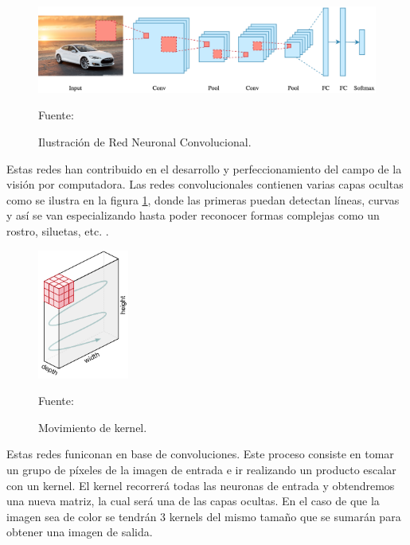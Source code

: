 \begin{figure}[H]
    \begin{center}
        \includegraphics[width=12cm]{img/capitulo_2/convolucional.png}
    \end{center}
    \begin{center}
        \caption{Ilustración de Red Neuronal Convolucional.}
        Fuente: \cite{intro_redes_neuronales}
        \label{fig:red_neuronal_convolucional}
    \end{center}
\end{figure}

Estas redes han contribuido en el desarrollo y perfeccionamiento del campo de la visión por computadora. Las redes convolucionales contienen varias capas ocultas como se ilustra en la figura \ref{fig:red_neuronal_convolucional}, donde las primeras puedan detectan líneas, curvas y así se van especializando hasta poder reconocer formas complejas como un rostro, siluetas, etc. \cite{convolutional:ia}. \\

\begin{figure}[H]
    \begin{center}
        \includegraphics[width=3cm]{img/capitulo_2/kernel.png}
    \end{center}
    \begin{center}
        \caption{Movimiento de kernel.}
        Fuente: \cite{comprension_redes_neuronales}
        \label{fig:kernel}
    \end{center}
\end{figure}

Estas redes funiconan en base de convoluciones. Este proceso consiste en tomar un grupo de píxeles de la imagen de entrada e ir realizando un producto escalar con un kernel. El kernel recorrerá todas las neuronas de entrada y obtendremos una nueva matriz, la cual será una de las capas ocultas. En el caso de que la imagen sea de color se tendrán 3 kernels del mismo tamaño que se sumarán para obtener una imagen de salida.\\

